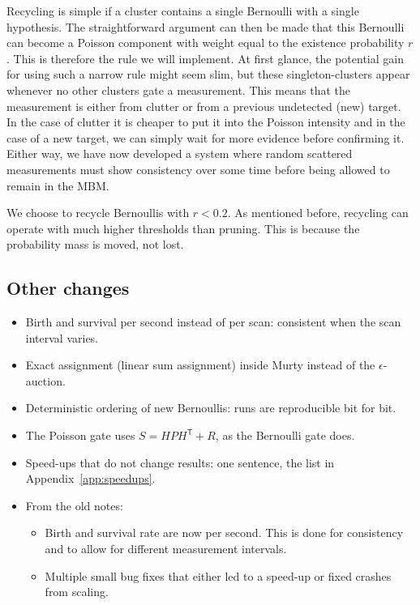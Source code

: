 Recycling is simple if a cluster contains a single Bernoulli with a single hypothesis. The straightforward argument can then be made that this Bernoulli can become a Poisson component with weight equal to the existence probability $r$. This is therefore the rule we will implement. At first glance, the potential gain for using such a narrow rule might seem slim, but these singleton-clusters appear whenever no other clusters gate a measurement. This means that the measurement is either from clutter or from a previous undetected (new) target. In the case of clutter it is cheaper to put it into the Poisson intensity and in the case of a new target, we can simply wait for more evidence before confirming it. Either way, we have now developed a system where random scattered measurements must show consistency over some time before being allowed to remain in the MBM.
\medskip

We choose to recycle Bernoullis with $r < 0.2$. As mentioned before, recycling can operate with much higher thresholds than pruning. This is because the probability mass is moved, not lost.


\subsection{Other changes}
\label{sec:impl-other}
\begin{itemize}
    \item Birth and survival per second instead of per scan: consistent when the scan interval varies.
    \item Exact assignment (linear sum assignment) inside Murty instead of the $\epsilon$-auction.
    \item Deterministic ordering of new Bernoullis: runs are reproducible bit for bit.
    \item The Poisson gate uses $S = HPH^{\mathsf{T}} + R$, as the Bernoulli gate does.
    \item Speed-ups that do not change results: one sentence, the list in Appendix~\ref{app:speedups}.
    \item From the old notes:
    \begin{itemize}
    \item Birth and survival rate are now per second. This is done for consistency and to allow for different measurement intervals.
    \item Multiple small bug fixes that either led to a speed-up or fixed crashes from scaling.
    \end{itemize}
\end{itemize}

